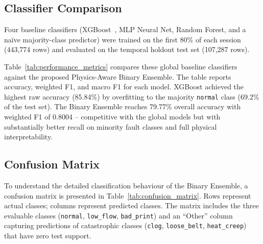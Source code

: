 \subsection{Classifier Comparison}
\label{sec:classifier_comparison}

Four baseline classifiers (XGBoost~\cite{chen2016xgboost}, MLP Neural Net, Random Forest,
and a na\"{i}ve majority-class predictor) were trained on the first 80\% of each session
(443,774 rows) and evaluated on the temporal holdout test set (107,287 rows).

Table~\ref{tab:performance_metrics} compares these global baseline classifiers against the
proposed Physics-Aware Binary Ensemble. The table reports accuracy, weighted F1, and macro
F1 for each model. XGBoost achieved the highest raw accuracy (85.84\%) by overfitting to the
majority \texttt{normal} class (69.2\% of the test set). The Binary Ensemble reaches 79.77\%
overall accuracy with weighted F1 of 0.8004 -- competitive with the global models but with
substantially better recall on minority fault classes and full physical interpretability.

\begin{table}[H]
\centering
\caption{Consolidated performance metrics -- temporal holdout (last 20\% of each session)}
\label{tab:performance_metrics}

\end{table}

\subsection{Confusion Matrix}
\label{sec:confusion}

To understand the detailed classification behaviour of the Binary Ensemble, a confusion
matrix is presented in Table~\ref{tab:confusion_matrix}. Rows represent actual classes;
columns represent predicted classes. The matrix includes the three evaluable classes
(\texttt{normal}, \texttt{low\_flow}, \texttt{bad\_print}) and an ``Other'' column
capturing predictions of catastrophic classes (\texttt{clog}, \texttt{loose\_belt},
\texttt{heat\_creep}) that have zero test support.

\begin{table}[H]
\centering
\caption{Binary Ensemble -- confusion matrix (temporal holdout, $n = 107{,}296$)}
\label{tab:confusion_matrix}

\end{table}

